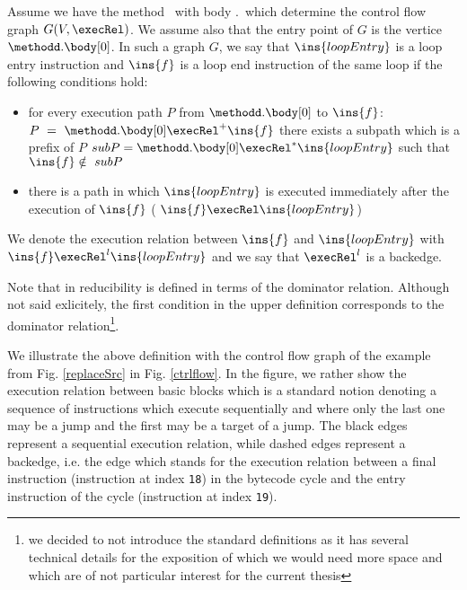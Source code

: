 \begin{defLoop}
\label{defLoop}
Assume we have the method \methodd \ with body \methodd.\body \ which determine the control flow graph $G(V, \execRel) $.  We assume also 
that the entry point of $G$ is the vertice  $\methodd.\body[0]$.
 In such a graph $G$, we say that $\ins{loopEntry}$ is a loop entry instruction and $\ins{f}$ is a loop end instruction
 of the same loop if the following conditions hold:
\begin{itemize}
\item for every execution path $P$ from $\methodd.\body[0]$ to  $\ins{f}$:   $P~=~\methodd.\body[0] \execRel^{+} \ins{f}$
 there exists a subpath which is a prefix of $P$  $subP = \methodd.\body[0] \execRel^{*} \ins{loopEntry}$ such that $\ins{f} \notin  \ subP  $
\item there is a path in which $\ins{loopEntry}$  is executed immediately after the execution of $\ins{f}$ ( $\ins{f} \execRel \ins{loopEntry}$)
\end{itemize}
We denote the execution relation between $\ins{f}$ and  $\ins{loopEntry}$ with \\
$\ins{f} \execRel^l \ins{loopEntry}$ and we say that $  \execRel^l $  is a backedge. 
\end{defLoop}
Note  that  in  \cite{ARUCom1986}  reducibility is defined in terms of the dominator relation. 
Although  not said exlicitely, the first condition in the upper definition corresponds to the dominator relation\footnote{we decided to not introduce the standard
definitions as it has several technical details for the exposition of which we would need more space and which are of not particular interest for the current thesis}.

We illustrate the above definition with the control flow graph of the example from Fig. \ref{replaceSrc} in Fig. \ref{ctrlflow}.
In the figure, we rather show the execution relation between basic blocks which is a standard notion denoting a sequence of instructions which execute sequentially
and  where only the last one may be a jump and the first may be a target of a jump. 
The black edges represent a sequential execution relation, while dashed edges represent a backedge, i.e. the edge which stands for the execution
relation between a final instruction (instruction at index \texttt{18}) in the bytecode cycle and the entry instruction of the cycle (instruction at index \texttt{19}).  

